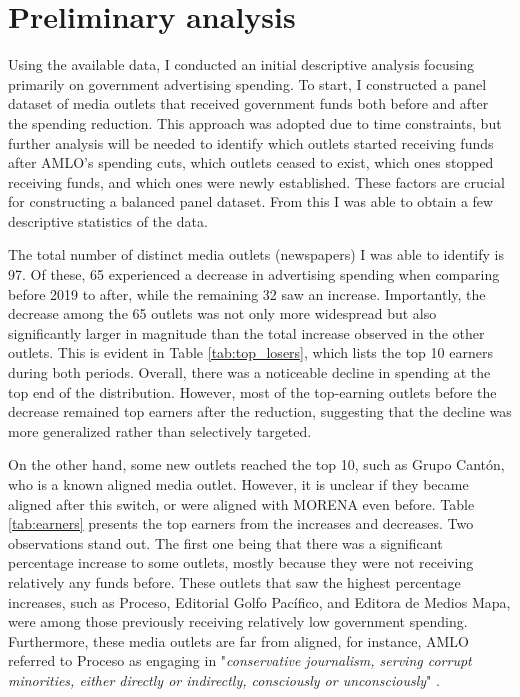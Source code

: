 \section{Preliminary analysis}
\label{sec:results}

Using the available data, I conducted an initial descriptive analysis focusing primarily on government advertising spending. To start, I constructed a panel dataset of media outlets that received government funds both before and after the spending reduction. This approach was adopted due to time constraints, but further analysis will be needed to identify which outlets started receiving funds after AMLO’s spending cuts, which outlets ceased to exist, which ones stopped receiving funds, and which ones were newly established. These factors are crucial for constructing a balanced panel dataset. From this I was able to obtain a few descriptive statistics of the data.

The total number of distinct media outlets (newspapers) I was able to identify is 97. Of these, 65 experienced a decrease in advertising spending when comparing before 2019 to after, while the remaining 32 saw an increase. Importantly, the decrease among the 65 outlets was not only more widespread but also significantly larger in magnitude than the total increase observed in the other outlets. This is evident in Table \ref{tab:top_losers}, which lists the top 10 earners during both periods. Overall, there was a noticeable decline in spending at the top end of the distribution. However, most of the top-earning outlets before the decrease remained top earners after the reduction, suggesting that the decline was more generalized rather than selectively targeted.



On the other hand, some new outlets reached the top 10, such as Grupo Cantón, who is a known aligned media outlet. However, it is unclear if they became aligned after this switch, or were aligned with MORENA even before. Table \ref{tab:earners} presents the top earners from the increases and decreases. Two observations stand out. The first one being that there was a significant percentage increase to some outlets, mostly because they were not receiving relatively any funds before. These outlets that saw the highest percentage increases, such as Proceso, Editorial Golfo Pacífico, and Editora de Medios Mapa, were among those previously receiving relatively low government spending. Furthermore, these media outlets are far from aligned, for instance, AMLO referred to Proceso as engaging in "\textit{conservative journalism, serving corrupt minorities, either directly or indirectly, consciously or unconsciously}" \citep{Attack-Proceso}. 

